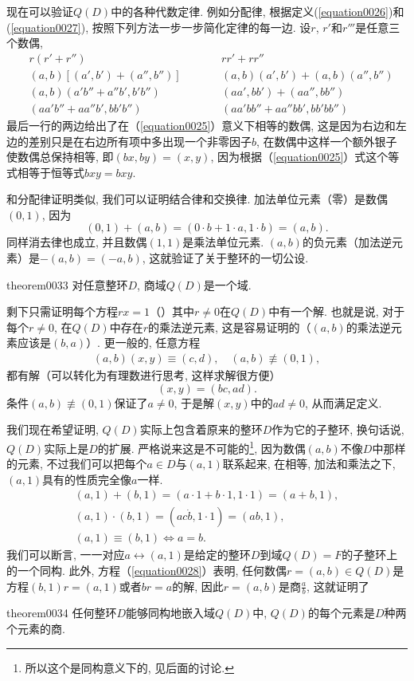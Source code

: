 现在可以验证$Q(D)$中的各种代数定律. 例如分配律, 根据定义(\ref{equation0026})和(\ref{equation0027}), 按照下列方法一步一步简化定律的每一边. 设$r$, $r'$和$r'''$是任意三个数偶, 
\[
\begin{aligned}
&r(r'+r'')\quad  \quad && rr'+rr'' \\
&(a,b)[(a',b')+(a'',b'')] \quad \quad && (a,b)(a',b')+(a,b)(a'',b'') \\
&(a, b)(a'b''+a''b', b'b'') \quad \quad && (aa', bb')+(aa'', bb'')\\
&(aa'b''+aa''b', bb'b'') \quad \quad && (aa'bb''+aa''bb', bb'bb'')
\end{aligned}
\]
最后一行的两边给出了在（\ref{equation0025}）意义下相等的数偶, 这是因为右边和左边的差别只是在右边所有项中多出现一个非零因子$b$, 在数偶中这样一个额外银子使数偶总保持相等, 即$(bx, by)=(x, y)$, 因为根据（\ref{equation0025}）式这个等式相等于恒等式$bxy=bxy$. 

和分配律证明类似, 我们可以证明结合律和交换律. 加法单位元素（零）是数偶$(0, 1)$, 因为
\[
(0, 1)+(a,b)=(0 \cdot b + 1 \cdot a, 1 \cdot b)=(a, b).
\]
同样消去律也成立, 并且数偶$(1,1)$是乘法单位元素. $(a, b)$的负元素（加法逆元素）是$-(a, b) = (-a, b)$, 这就验证了关于整环的一切公设. 

\begin{theorem}{}{theorem0033}
对任意整环$D$, 商域$Q(D)$是一个域. 
\end{theorem}
 剩下只需证明每个方程$rx=1$（）其中$r \neq 0$在$Q(D)$中有一个解. 也就是说, 对于每个$r \neq 0$, 在$Q(D)$中存在$r$的乘法逆元素, 这是容易证明的（$(a, b)$的乘法逆元素应该是$(b, a)$）. 更一般的, 任意方程
\begin{gather}
(a, b)(x, y)\equiv(c, d), \quad (a, b)\not\equiv(0, 1),\label{equation0028}
\end{gather}
都有解（可以转化为有理数进行思考, 这样求解很方便）
\[
(x, y) = (bc, ad).
\]
条件$(a, b) \not\equiv (0, 1)$保证了$a \neq 0$, 于是解$(x, y)$中的$ad \neq 0$, 从而满足定义. 

我们现在希望证明, $Q(D)$实际上包含着原来的整环$D$作为它的子整环, 换句话说, $Q(D)$实际上是$D$的扩展. 严格说来这是不可能的\footnote{所以这个是同构意义下的, 见后面的讨论. }, 因为数偶$(a, b)$不像$D$中那样的元素, 不过我们可以把每个$a \in D$与$(a, 1)$联系起来, 在相等, 加法和乘法之下, $(a, 1)$具有的性质完全像$a$一样. 
\begin{gather*}
(a, 1)+(b,1)=(a \cdot 1 + b \cdot 1, 1 \cdot 1) = (a+b,1),\\
(a,1)\cdot(b,1)=(a c\dot b, 1 \cdot 1)=(ab, 1),\\
(a,1)\equiv(b,1) \Leftrightarrow a=b.
\end{gather*}
我们可以断言, 一一对应$a \leftrightarrow (a,1)$是给定的整环$D$到域$Q(D)=F$的子整环上的一个同构. 此外, 方程（\ref{equation0028}）表明, 任何数偶$r=(a,b) \in Q(D)$是方程$(b,1)r=(a,1)$或者$br=a$的解, 因此$r=(a,b)$是商$\frac{a}{b}$, 这就证明了
\begin{theorem}{}{theorem0034}
任何整环$D$能够同构地嵌入域$Q(D)$中, $Q(D)$的每个元素是$D$种两个元素的商. 
\end{theorem}

